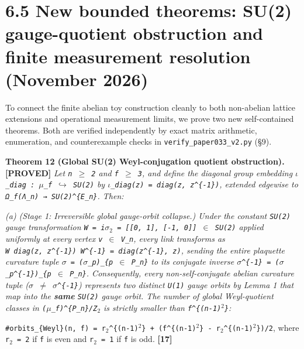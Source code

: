 \documentclass[
  american,
  11pt,
  letterpaper,
]{article}
\begin{document}
\section{6.5 New bounded theorems: SU(2) gauge-quotient obstruction and finite measurement resolution (November 2026)}\label{new-bounded-theorems-su2-gauge-quotient-obstruction-and-finite-measurement-resolution-november-2026}

To connect the finite abelian toy construction cleanly to both non-abelian lattice extensions and operational measurement limits, we prove two new self-contained theorems. Both are verified independently by exact matrix arithmetic, enumeration, and counterexample checks in \nolinkurl{verify_paper033_v2.py} (§9).

\textbf{Theorem 12 (Global SU(2) Weyl-conjugation quotient obstruction). {[}PROVED{]}} \emph{Let \texttt{n\ \ensuremath{\geq}\ 2} and \texttt{f\ \ensuremath{\geq}\ 3}, and define the diagonal group embedding \texttt{\ensuremath{\iota}\_diag\ :\ \ensuremath{\mu}\_f\ \ensuremath{\hookrightarrow}\ SU(2)} by \texttt{\ensuremath{\iota}\_diag(z)\ =\ diag(z,\ z\^{}\{-1\})}, extended edgewise to \texttt{Ω\_f(Λ\_n)\ →\ SU(2)\^{}\{E\_n\}}. Then:}

\emph{(a) (Stage 1: Irreversible global gauge-orbit collapse.) Under the constant \texttt{SU(2)} gauge transformation \texttt{W\ =\ i\ensuremath{\sigma}\ensuremath{{}_{2}}\ =\ {[}{[}0,\ 1{]},\ {[}-1,\ 0{]}{]}\ \ensuremath{\in}\ SU(2)} applied uniformly at every vertex \texttt{v\ \ensuremath{\in}\ V\_n}, every link transforms as \texttt{W\ diag(z,\ z\^{}\{-1\})\ W\^{}\{-1\}\ =\ diag(z\^{}\{-1\},\ z)}, sending the entire plaquette curvature tuple \texttt{\ensuremath{\sigma}\ =\ (\ensuremath{\sigma}\_p)\_\{p\ \ensuremath{\in}\ P\_n\}} to its conjugate inverse \texttt{\ensuremath{\sigma}\^{}\{-1\}\ =\ (\ensuremath{\sigma}\_p\^{}\{-1\})\_\{p\ \ensuremath{\in}\ P\_n\}}. Consequently, every non-self-conjugate abelian curvature tuple (\texttt{\ensuremath{\sigma}\ \ensuremath{\neq}\ \ensuremath{\sigma}\^{}\{-1\}}) represents two distinct \texttt{U(1)} gauge orbits by Lemma 1 that map into the \textbf{same} \texttt{SU(2)} gauge orbit. The number of global Weyl-quotient classes in \texttt{(\ensuremath{\mu}\_f)\^{}\{P\_n\}/Z\ensuremath{{}_{2}}} is strictly smaller than \texttt{f\^{}\{(n-1)\ensuremath{{}^{2}}\}}:}

\texttt{\#orbits\_\{Weyl\}(n,\ f)\ =\ r\ensuremath{{}_{2}}\^{}\{(n-1)\ensuremath{{}^{2}}\}\ +\ (f\^{}\{(n-1)\ensuremath{{}^{2}}\}\ -\ r\ensuremath{{}_{2}}\^{}\{(n-1)\ensuremath{{}^{2}}\})/2}, where \texttt{r\ensuremath{{}_{2}}\ =\ 2} if \texttt{f} is even and \texttt{r\ensuremath{{}_{2}}\ =\ 1} if \texttt{f} is odd. \textbf{{[}17{]}}
\end{document}
